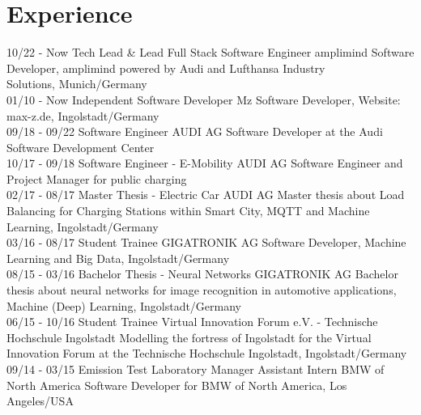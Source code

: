 \documentclass[]{friggeri-cv}
\begin{document}
\section{Experience}
\begin{entrylist}
    \entry
    {10/22 - Now}
    {Tech Lead \& Lead Full Stack Software Engineer}
    {amplimind}
    {Software Developer, amplimind powered by Audi and Lufthansa Industry \\ Solutions, Munich/Germany\\}
    \entry
    {01/10 - Now}
    {Independent Software Developer}
    {Mz}
    {Software Developer, Website: max-z.de, Ingolstadt/Germany\\}
    \entry
    {09/18 - 09/22}
    {Software Engineer}
    {AUDI AG}
    {Software Developer at the Audi Software Development Center\\}
    \entry
    {10/17 - 09/18}
    {Software Engineer - E-Mobility}
    {AUDI AG}
    {Software Engineer and Project Manager for public charging \\}
    \entry
    {02/17 - 08/17}
    {Master Thesis - Electric Car}
    {AUDI AG}
    {Master thesis about Load Balancing for Charging Stations within Smart City, MQTT and Machine Learning, Ingolstadt/Germany\\}
    \entry
    {03/16 - 08/17}
    {Student Trainee}
    {GIGATRONIK AG}
    {Software Developer, Machine Learning and Big Data,  Ingolstadt/Germany\\}
    \entry
    {08/15 - 03/16}
    {Bachelor Thesis - Neural Networks}
    {GIGATRONIK AG}
    {Bachelor thesis about neural networks for image recognition in automotive applications, Machine (Deep) Learning, Ingolstadt/Germany\\}
    \entry
    {06/15 - 10/16}
    {Student Trainee}
    {Virtual Innovation Forum e.V. - Technische Hochschule Ingolstadt}
    {Modelling the fortress of Ingolstadt for the Virtual Innovation Forum at the Technische Hochschule Ingolstadt, Ingolstadt/Germany\\}
  \entry
    {09/14 - 03/15}
    {Emission Test Laboratory Manager Assistant Intern}
    {BMW of North America}
    {Software Developer for BMW of North America, Los Angeles/USA\\}

\end{entrylist}
\end{document}
